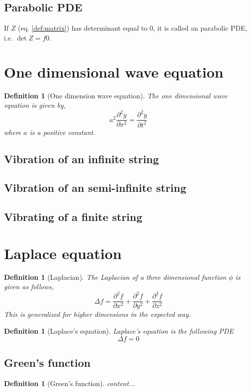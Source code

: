\documentclass[oneside,11pt,pdftex,final]{book}%
\numberwithin{equation}{section}
\newtheorem{definition}[theorem]{Definition}
\numberwithin{section}{chapter}
\numberwithin{equation}{chapter}
\begin{document}
\subsection{Parabolic PDE}
If $ Z $ (eq. \ref{def:matrix}) has determinant equal to $ 0 $, it is called an parabolic PDE, i.e. $ \det Z =f 0 $.

\section{One dimensional wave equation}
\begin{definition}[One dimension wave equation]
	The one dimensional wave equation is given by,\[ a^2 \frac{\partial^2y}{\partial x^2}=\frac{\partial^2y}{\partial t^2} \]
	where $ a $ is a positive constant.
\end{definition}

\subsection{Vibration of an infinite string}
\subsection{Vibration of an semi-infinite string}
\subsection{Vibrating of a finite string}



\section{Laplace equation}
\begin{definition}[Laplacian]
	The Laplacian of a three dimensional function $ \phi $ is given as follows,
	\[ \Delta f= \frac{\partial^2 f}{\partial x^2}+\frac{\partial^2 f}{\partial y^2}+\frac{\partial^2 f}{\partial z^2} \]
	This is generalized for higher dimensions in the expected way.
\end{definition}

\begin{definition}[Laplace's equation]
	Laplace's equation is the following PDE
	\[ \Delta f = 0 \]
\end{definition}
\subsection{Green's function}
\begin{definition}[Green's function]
	content...
\end{definition}
\end{document}
